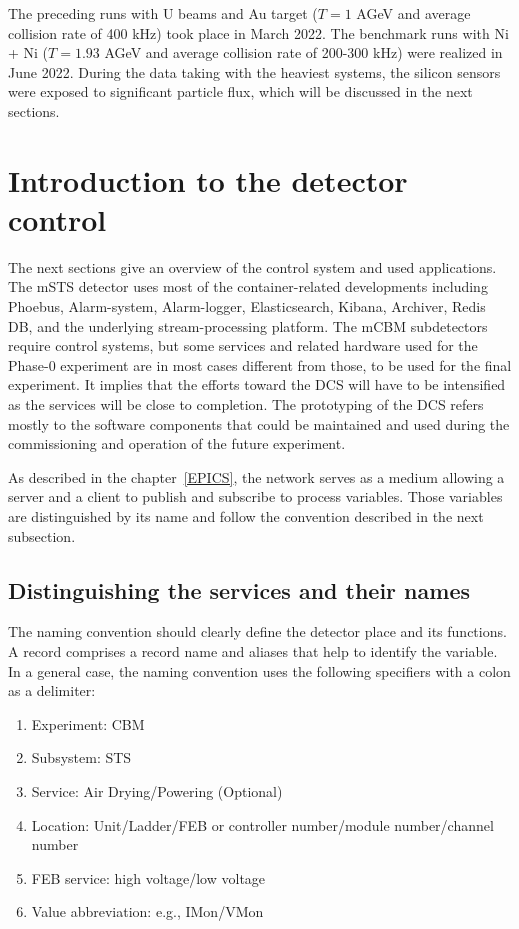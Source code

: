 The preceding runs with U beams and Au target ($T = 1$ AGeV and average collision rate of 400 kHz) took place in March 2022. The benchmark runs with Ni + Ni ($T = 1.93$ AGeV and average collision rate of 200-300 kHz) were realized in June 2022. During the data taking with the heaviest systems, the silicon sensors were exposed to significant particle flux, which will be discussed in the next sections. 
\section{Introduction to the detector control}
The next sections give an overview of the control system and used applications. The \gls{mSTS} detector uses most of the container-related developments including Phoebus, Alarm-system, Alarm-logger, Elasticsearch, Kibana, Archiver, Redis \gls{DB}, and the underlying stream-processing platform. The \gls{mCBM} subdetectors require control systems, but some services and related hardware used for the Phase-0 experiment are in most cases different from those, to be used for the final experiment. It implies that the efforts toward the \gls{DCS} will have to be intensified as the services will be close to completion. The prototyping of the \gls{DCS} refers mostly to the software components that could be maintained and used during the commissioning and operation of the future experiment. 

As described in the chapter~\ref{EPICS}, the network serves as a medium allowing a server and a client to publish and subscribe to process variables. Those variables are distinguished by its name and follow the convention described in the next subsection.
\subsection{Distinguishing the services and their names}
The naming convention should clearly define the detector place and its functions.  A record comprises a record name and aliases that help to identify the variable. In a general case, the naming convention uses the following specifiers with a colon as a delimiter:
\begin{enumerate} 
\item Experiment: \gls{CBM}
\item Subsystem: \gls{STS}
\item Service: Air Drying/Powering (Optional)
\item Location: Unit/Ladder/FEB or controller number/module number/channel number
\item \gls{FEB} service: high voltage/low voltage
\item Value abbreviation: e.g., IMon/VMon
\end{enumerate}

